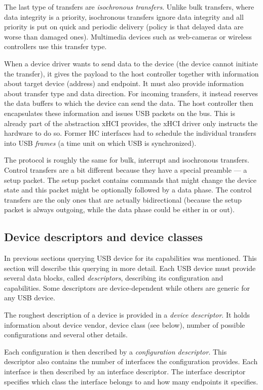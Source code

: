 The last type of transfers are \textit{isochronous transfers}. Unlike bulk
transfers, where data integrity is a priority, isochronous transfers ignore
data integrity and all priority is put on quick and periodic delivery (policy
is that delayed data are worse than damaged ones). Multimedia devices such as
web-cameras or wireless controllers use this transfer type.

When a device driver wants to send data to the device (the device cannot
initiate the transfer), it gives the payload to the host controller together
with information about target device (address) and endpoint. It must also
provide information about transfer type and data direction. For incoming
transfers, it instead reserves the data buffers to which the device can send
the data. The host controller then encapsulates these information and issues
USB packets on the bus. This is already part of the abstraction xHCI provides,
the xHCI driver only instructs the hardware to do so. Former HC interfaces had
to schedule the individual transfers into USB \emph{frames} (a time unit on
which USB is synchronized).

The protocol is roughly the same for bulk, interrupt and isochronous
transfers. Control transfers are a bit different because they have a special
preamble — a setup packet. The setup packet contains commands that might
change the device state and this packet might be optionally followed by a data
phase. The control transfers are the only ones that are actually bidirectional
(because the setup packet is always outgoing, while the data phase could be
either in or out).

\subsection{Device descriptors and device classes}

In previous sections querying USB device for its capabilities was mentioned.
This section will describe this querying in more detail. Each USB device must
provide several data blocks, called \textit{descriptors}, describing its
configuration and capabilities. Some descriptors are device-dependent while
others are generic for any USB device.

The roughest description of a device is provided in a \textit{device
descriptor}. It holds information about device vendor, device class (see
below), number of possible configurations and several other details.

Each configuration is then described by a \textit{configuration descriptor}.
This descriptor also contains the number of interfaces the configuration
provides. Each interface is then described by an interface descriptor. The
interface descriptor specifies which class the interface belongs to and how
many endpoints it specifies.

